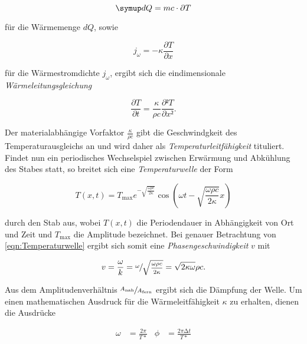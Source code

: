 \begin{equation}
    \symup d Q = mc \cdot \partial{}T
\end{equation}

für die Wärmemenge $dQ$, sowie

\begin{equation}
    j_\omega = -\kappa \frac{\partial{}T}{\partial{}x}
\end{equation}

für die Wärmestromdichte $j_\omega$, ergibt sich die eindimensionale \emph{Wärmeleitungsgleichung}

\begin{equation}
    \frac{\partial T}{\partial t} = \frac{\kappa}{\rho c} \frac{\partial² T}{\partial x²}.
\end{equation}

Der materialabhängige Vorfaktor $\frac{\kappa}{\rho c}$ gibt die Geschwindgkeit des Temperaturausgleichs 
an und wird daher als \emph{Temperaturleitfähigkeit} tituliert. \\
Findet nun ein periodisches Wechselspiel zwischen Erwärmung und Abkühlung des Stabes statt,
so breitet sich eine \emph{Temperaturwelle} der Form

\begin{equation}
\label{eqn:Temperaturwelle}
    T(x,t) = T_{\mathrm{max}} e^{-\sqrt{\frac{\omega \rho c}{2\kappa}}}\cos\left(\omega t - \sqrt{\frac{\omega \rho c}{2\kappa}}x\right)
\end{equation}

durch den Stab aus, wobei $T(x,t)$ die Periodendauer in Abhängigkeit von Ort und Zeit und $T_\text{max}$ die Amplitude bezeichnet.
Bei genauer Betrachtung von \eqref{eqn:Temperaturwelle} ergibt sich somit eine \emph{Phasengeschwindigkeit} $v$ mit 

\begin{equation}
\label{eqn:Phasengeschwindigkeit}
    v = \frac{\omega}{k} = \sfrac{\omega}{\sqrt{\frac{\omega \rho c}{2\kappa}}} = \sqrt{2\kappa \omega}{\rho c}.
\end{equation}

Aus dem Amplitudenverhältnis $\sfrac{A_\text{nah}}{A_\text{fern}}$ ergibt sich die Dämpfung der Welle. Um einen mathematischen Ausdruck 
für die Wärmeleitfähigkeit $\kappa$ zu erhalten, dienen die Ausdrücke 

\begin{align*}
    \omega &= \frac{2\pi}{T*} & \phi &= \frac{2\pi \increment t}{T*}
\end{align*}

